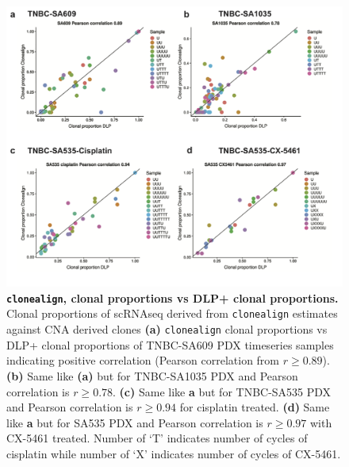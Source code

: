 \begin{figure}
\centering
\includegraphics[width=\textwidth]{Figures/chap5/Clonealigncorrelation.png}
	
\caption[\texttt{clonealign} clonal proportions vs DLP+ clonal proportions]
	{\small
	\textbf{\texttt{clonealign}, clonal proportions vs DLP+ clonal proportions.}
	   Clonal proportions of scRNAseq  derived from \texttt{clonealign} estimates against CNA derived clones
	   \textbf{(a)} \texttt{clonealign} clonal proportions vs DLP+ clonal proportions of TNBC-SA609 PDX timeseries samples indicating positive correlation (Pearson correlation from $r \geq 0.89$).
	 \textbf{(b)} Same like \textbf{(a)} but for TNBC-SA1035 PDX and Pearson correlation is $r \geq 0.78$. \textbf{(c)} Same like \textbf{a} but for TNBC-SA535 PDX and Pearson correlation is $r \geq 0.94$ for cisplatin treated. \textbf{(d)} Same like \textbf{a} but for SA535 PDX and Pearson correlation is $r \geq 0.97$ with CX-5461 treated. Number of `T' indicates number of cycles of cisplatin while number of `X' indicates number of cycles of CX-5461.}
	 
	\label{fig:Clonealigncorrelation}
\end{figure}





